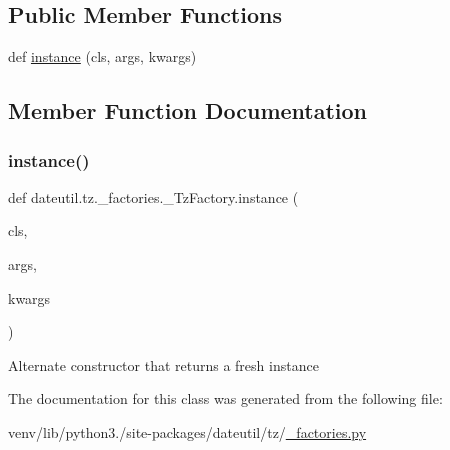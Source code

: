 \subsection*{Public Member Functions}
\begin{DoxyCompactItemize}
\item 
def \hyperlink{classdateutil_1_1tz_1_1__factories_1_1__TzFactory_a98e4abf3ae6d579c9674a65c23a61bcf}{instance} (cls, args, kwargs)
\end{DoxyCompactItemize}


\subsection{Member Function Documentation}
\mbox{\label{classdateutil_1_1tz_1_1__factories_1_1__TzFactory_a98e4abf3ae6d579c9674a65c23a61bcf}} 
\subsubsection{\texorpdfstring{instance()}{instance()}}
{\footnotesize\ttfamily def dateutil.\+tz.\+\_\+factories.\+\_\+\+Tz\+Factory.\+instance (\begin{DoxyParamCaption}\item[{}]{cls,  }\item[{}]{args,  }\item[{}]{kwargs }\end{DoxyParamCaption})}

\begin{DoxyVerb}Alternate constructor that returns a fresh instance\end{DoxyVerb}
 

The documentation for this class was generated from the following file\+:\begin{DoxyCompactItemize}
\item 
venv/lib/python3./site-\/packages/dateutil/tz/\hyperlink{__factories_8py}{\+\_\+factories.\+py}\end{DoxyCompactItemize}
